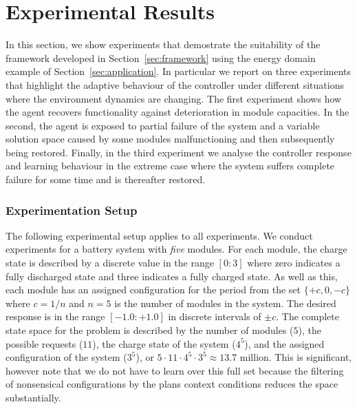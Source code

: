 
\section{Experimental Results}\label{sec:results}

In this section, we show experiments that demostrate the suitability of the framework developed in Section~\ref{sec:framework} using the energy domain example of Section~\ref{sec:application}. In particular we report on three experiments that highlight the adaptive behaviour of the controller under different situations where the environment dynamics are changing. The first experiment shows how the agent recovers functionality against deterioration in module capacities. In the second, the agent is exposed to partial failure of the system and a variable solution space caused by some modules malfunctioning and then subsequently being restored. Finally, in the third experiment we analyse the controller response and learning behaviour in the extreme case where the system suffers complete failure for some time and is thereafter restored.

\subsubsection{Experimentation Setup}

The following experimental setup applies to all experiments. We conduct experiments for a battery system with {\em five} modules. For each module, the charge state is described by a discrete value in the range $[0:3]$ where zero indicates a fully discharged state and three indicates a fully charged state. As well as this, each module has an assigned configuration for the period from the set $\{+c, 0, -c\}$ where $c=1/n$ and $n=5$ is the number of modules in the system. The desired response is in the range $[-1.0:+1.0]$ in discrete intervals of $\pm c$. The complete state space for the problem is described by the number of modules ($5$), the possible requests ($11$), the charge state of the system ($4^5$), and the assigned configuration of the system ($3^5$), or $5 \cdot 11 \cdot 4^5 \cdot 3^5 \approx 13.7$ million. This is significant, however note that we do not have to learn over this full set because the filtering of nonsensical configurations by the plans context conditions reduces the space substantially.

